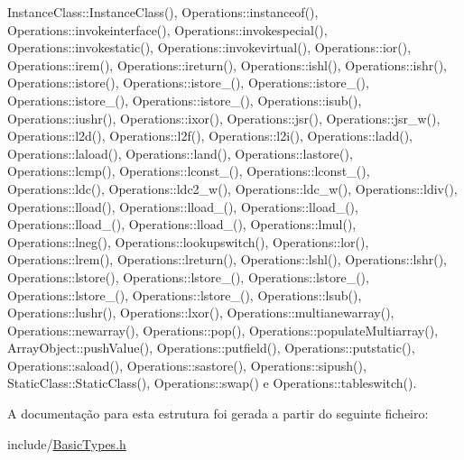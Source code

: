 Instance\+Class\+::\+Instance\+Class(), Operations\+::instanceof(), Operations\+::invokeinterface(), Operations\+::invokespecial(), Operations\+::invokestatic(), Operations\+::invokevirtual(), Operations\+::ior(), Operations\+::irem(), Operations\+::ireturn(), Operations\+::ishl(), Operations\+::ishr(), Operations\+::istore(), Operations\+::istore\+\_(), Operations\+::istore\+\_(), Operations\+::istore\+\_(), Operations\+::istore\+\_(), Operations\+::isub(), Operations\+::iushr(), Operations\+::ixor(), Operations\+::jsr(), Operations\+::jsr\+\_\+w(), Operations\+::l2d(), Operations\+::l2f(), Operations\+::l2i(), Operations\+::ladd(), Operations\+::laload(), Operations\+::land(), Operations\+::lastore(), Operations\+::lcmp(), Operations\+::lconst\+\_(), Operations\+::lconst\+\_(), Operations\+::ldc(), Operations\+::ldc2\+\_\+w(), Operations\+::ldc\+\_\+w(), Operations\+::ldiv(), Operations\+::lload(), Operations\+::lload\+\_(), Operations\+::lload\+\_(), Operations\+::lload\+\_(), Operations\+::lload\+\_(), Operations\+::lmul(), Operations\+::lneg(), Operations\+::lookupswitch(), Operations\+::lor(), Operations\+::lrem(), Operations\+::lreturn(), Operations\+::lshl(), Operations\+::lshr(), Operations\+::lstore(), Operations\+::lstore\+\_(), Operations\+::lstore\+\_(), Operations\+::lstore\+\_(), Operations\+::lstore\+\_(), Operations\+::lsub(), Operations\+::lushr(), Operations\+::lxor(), Operations\+::multianewarray(), Operations\+::newarray(), Operations\+::pop(), Operations\+::populate\+Multiarray(), Array\+Object\+::push\+Value(), Operations\+::putfield(), Operations\+::putstatic(), Operations\+::saload(), Operations\+::sastore(), Operations\+::sipush(), Static\+Class\+::\+Static\+Class(), Operations\+::swap() e Operations\+::tableswitch().



A documentação para esta estrutura foi gerada a partir do seguinte ficheiro\+:\begin{DoxyCompactItemize}
\item 
include/\hyperlink{BasicTypes_8h}{Basic\+Types.\+h}\end{DoxyCompactItemize}
